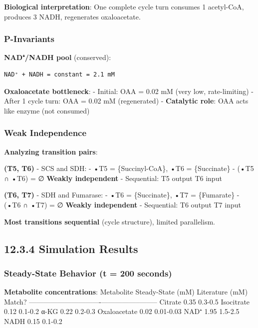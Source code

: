 \textbf{Biological interpretation}: One complete cycle turn consumes 1
acetyl-CoA, produces 3 NADH, regenerates oxaloacetate.

\hypertarget{p-invariants}{%
\subsubsection{P-Invariants}\label{p-invariants}}

\textbf{NAD⁺/NADH pool} (conserved):

\begin{lstlisting}
NAD⁺ + NADH = constant = 2.1 mM
\end{lstlisting}

\textbf{Oxaloacetate bottleneck}: - Initial: OAA = 0.02 mM (very low,
rate-limiting) - After 1 cycle turn: OAA = 0.02 mM (regenerated) -
\textbf{Catalytic role}: OAA acts like enzyme (not consumed)

\hypertarget{weak-independence}{%
\subsubsection{Weak Independence}\label{weak-independence}}

\textbf{Analyzing transition pairs}:

\textbf{(T5, T6)} - SCS and SDH: - •T5 = \{Succinyl-CoA\}, •T6 =
\{Succinate\} - (•T5 ∩ •T6) = ∅ \textrightarrow \textbf{Weakly independent} -
Sequential: T5 output \textrightarrow T6 input

\textbf{(T6, T7)} - SDH and Fumarase: - •T6 = \{Succinate\}, •T7 =
\{Fumarate\} - (•T6 ∩ •T7) = ∅ \textrightarrow \textbf{Weakly independent} -
Sequential: T6 output \textrightarrow T7 input

\textbf{Most transitions sequential} (cycle structure), limited
parallelism.

\hypertarget{simulation-results-1}{%
\subsection{12.3.4 Simulation Results}\label{simulation-results-1}}

\hypertarget{steady-state-behavior-t-200-seconds}{%
\subsubsection{Steady-State Behavior (t = 200
seconds)}\label{steady-state-behavior-t-200-seconds}}

\textbf{Metabolite concentrations}: \textbar{} Metabolite \textbar{}
Steady-State (mM) \textbar{} Literature (mM) \textbar{} Match?
\textbar{}
\textbar------------\textbar-------------------\textbar-----------------\textbar--------\textbar{}
\textbar{} Citrate \textbar{} 0.35 \textbar{} 0.3-0.5 \textbar{} \checkmark
\textbar{} \textbar{} Isocitrate \textbar{} 0.12 \textbar{} 0.1-0.2
\textbar{} \checkmark \textbar{} \textbar{} α-KG \textbar{} 0.22 \textbar{}
0.2-0.3 \textbar{} \checkmark \textbar{} \textbar{} Oxaloacetate \textbar{} 0.02
\textbar{} 0.01-0.03 \textbar{} \checkmark \textbar{} \textbar{} NAD⁺ \textbar{}
1.95 \textbar{} 1.5-2.5 \textbar{} \checkmark \textbar{} \textbar{} NADH
\textbar{} 0.15 \textbar{} 0.1-0.2 \textbar{} \checkmark \textbar{}

